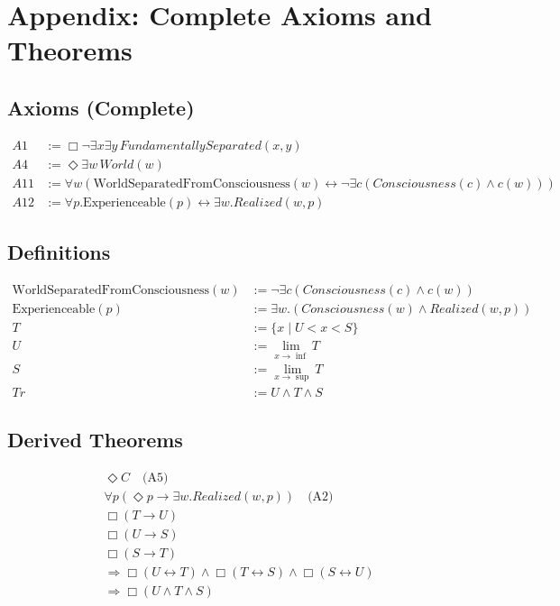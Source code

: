\documentclass[
]{article}
\begin{document}
\section{Appendix: Complete Axioms and Theorems}\label{appendix-complete-axioms-and-theorems}

\subsection{Axioms (Complete)}\label{axioms-complete}

\[
\begin{aligned}
A1 &:= \Box\neg\exists x\exists y\, FundamentallySeparated(x,y) \\
A4 &:= \Diamond\exists w\, World(w) \\
A11 &:= \forall w \left( \text{WorldSeparatedFromConsciousness}(w) \leftrightarrow \neg \exists c (Consciousness(c) \land c(w)) \right) \\
A12 &:= \forall p. \text{Experienceable}(p) \leftrightarrow \exists w. Realized(w, p)
\end{aligned}
\]

\subsection{Definitions}\label{definitions}

\[
\begin{aligned}
\text{WorldSeparatedFromConsciousness}(w) &:= \neg \exists c (Consciousness(c) \land c(w)) \\
\text{Experienceable}(p) &:= \exists w. (Consciousness(w) \land Realized(w, p)) \\
T &:= \{ x \mid U < x < S \} \\
U &:= \lim_{x \to \inf} T \\
S &:= \lim_{x \to \sup} T \\
Tr &:= U \land T \land S
\end{aligned}
\]

\subsection{Derived Theorems}\label{derived-theorems}

\[
\begin{aligned}
& \Diamond C \quad \text{(A5)} \\
& \forall p(\Diamond p \rightarrow \exists w. Realized(w,p)) \quad \text{(A2)} \\
& \Box(T \rightarrow U) \\
& \Box(U \rightarrow S) \\
& \Box(S \rightarrow T) \\
& \Rightarrow \Box(U \leftrightarrow T) \land \Box(T \leftrightarrow S) \land \Box(S \leftrightarrow U) \\
& \Rightarrow \Box(U \land T \land S)
\end{aligned}
\]
\end{document}
